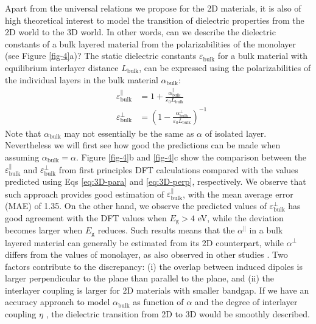 \documentclass[journal=ancac3,manuscript=article,email=true,hyperref=true,keywords=false]{achemso}
\begin{document}
Apart from the universal relations we propose for the 2D materials, it
is also of high theoretical interest to model the transition of
dielectric properties from the 2D world to the 3D world. In other
words, can we describe the dielectric constants of a bulk layered
material from the polarizabilities of the monolayer (see Figure
\ref{fig-4}a)? The static dielectric constants
$\varepsilon_{\mathrm{bulk}}$ for a bulk material with equilibrium
interlayer distance $L_{\mathrm{bulk}}$, can be expressed using the
polarizabilities of the individual layers in the bulk material
$\alpha_{\mathrm{bulk}}$:
\begin{eqnarray}
  \label{eq:3D-para}
  &\varepsilon^{\parallel}_{\mathrm{bulk}} &= 1 + {\displaystyle \frac{\alpha_{\mathrm{bulk}}^{\parallel}}{\varepsilon_{0} L_{\mathrm{bulk}}}}\\
  \label{eq:3D-perp}
  &\varepsilon^{\perp}_{\mathrm{bulk}} &= \left(1 - \frac{\alpha_{\mathrm{bulk}}^{\perp}}{\varepsilon_{0} L_{\mathrm{bulk}}}\right)^{-1}
\end{eqnarray}
Note that $\alpha_{\mathrm{bulk}}$ may not essentially be the same as
$\alpha$ of isolated layer. Nevertheless we will first see how good
the predictions can be made when assuming
$\alpha_{\mathrm{bulk}}=\alpha$. Figure \ref{fig-4}b and \ref{fig-4}c
show the comparison between the
$\varepsilon_{\mathrm{bulk}}^{\parallel}$ and
$\varepsilon_{\mathrm{bulk}}^{\perp}$ from first principles DFT
calculations compared with the values predicted using Eqs
\ref{eq:3D-para} and \ref{eq:3D-perp}, respectively. We observe that
such approach provides good estimation of
$\varepsilon_{\mathrm{bulk}}^{\parallel}$, with the mean average error
(MAE) of 1.35. On the other hand, we observe the predicted values of
$\varepsilon_{\mathrm{bulk}}^{\perp}$ has good agreement with the DFT
values when $E_{\mathrm{g}}>4$ eV, while the deviation becomes larger
when $E_{\mathrm{g}}$ reduces. Such results means that the
$\alpha^{\parallel}$ in a bulk layered material can generally be
estimated from its 2D counterpart, while $\alpha^{\perp}$ differs from
the values of monolayer, as also observed in other studies
\cite{Andersen_2015_dielec_vdWH,Laturia_2018}. Two factors contribute
to the discrepancy: (i) the overlap between induced dipoles is larger
perpendicular to the plane than parallel to the plane, and (ii) the
interlayer coupling is larger for 2D materials with smaller
bandgap. If we have an accuracy approach to model
$\alpha_{\mathrm{bulk}}$ as function of $\alpha$ and the degree of
interlayer coupling $\eta$ \cite{Tkatchenko_2012}, the dielectric
transition from 2D to 3D would be smoothly described.
\end{document}
